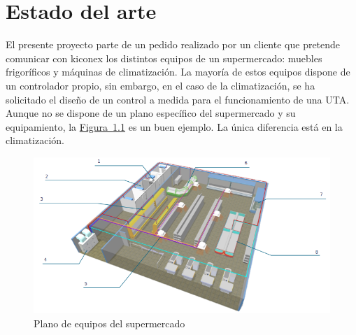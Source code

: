 
\cleardoublepage
\chapter{Estado del arte}

\label{chap:estadoArte} %

El presente proyecto parte de un pedido realizado por un cliente que pretende comunicar con kiconex los distintos equipos de un supermercado: muebles frigoríficos y máquinas de climatización. La mayoría de estos equipos dispone de un controlador propio, sin embargo, en el caso de la climatización, se ha solicitado el diseño de un control a medida para el funcionamiento de una UTA. Aunque no se dispone de un plano específico del supermercado y su equipamiento, la \hyperref[figura:planoSupermercado]{Figura~\ref{figura:planoSupermercado}} es un buen ejemplo. La única diferencia está en la climatización.

\hspace{1em}

\begin{figure}[h]
  \centering
  \includegraphics[width=16cm, keepaspectratio]{img/planoSupermercado}
  \caption{Plano de equipos del supermercado}
  \label{figura:planoSupermercado}
\end{figure}

